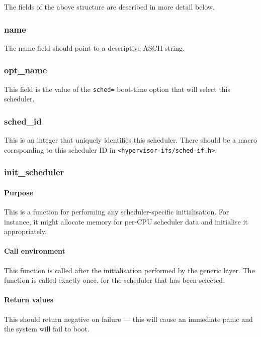 \documentclass[11pt,twoside,final,openright]{xenstyle}
\begin{document}
The fields of the above structure are described in more detail below.

\subsubsection{name}

The name field should point to a descriptive ASCII string.

\subsubsection{opt\_name}

This field is the value of the {\tt sched=} boot-time option that will select
this scheduler.

\subsubsection{sched\_id}

This is an integer that uniquely identifies this scheduler.  There should be a
macro corrsponding to this scheduler ID in {\tt <hypervisor-ifs/sched-if.h>}.

\subsubsection{init\_scheduler}

\paragraph*{Purpose}

This is a function for performing any scheduler-specific initialisation.  For
instance, it might allocate memory for per-CPU scheduler data and initialise it
appropriately.

\paragraph*{Call environment}

This function is called after the initialisation performed by the generic
layer.  The function is called exactly once, for the scheduler that has been
selected.

\paragraph*{Return values}

This should return negative on failure --- this will cause an
immediate panic and the system will fail to boot.
\end{document}
